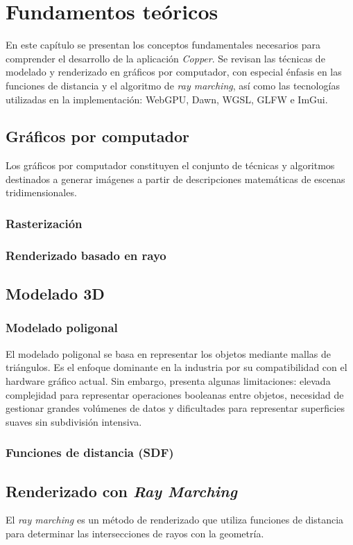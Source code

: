 \chapter{Fundamentos teóricos}

En este capítulo se presentan los conceptos fundamentales necesarios para comprender el desarrollo de la aplicación \textit{Copper}. Se revisan las técnicas de modelado y renderizado en gráficos por computador, con especial énfasis en las funciones de distancia y el algoritmo de \textit{ray marching}, así como las tecnologías utilizadas en la implementación: WebGPU, Dawn, WGSL, GLFW e ImGui.

\section{Gráficos por computador}
Los gráficos por computador constituyen el conjunto de técnicas y algoritmos destinados a generar imágenes a partir de descripciones matemáticas de escenas tridimensionales.


\subsection{Rasterización}
\subsection{Renderizado basado en rayo}

\section{Modelado 3D}
\subsection{Modelado poligonal}
El modelado poligonal se basa en representar los objetos mediante mallas de triángulos. Es el enfoque dominante en la industria por su compatibilidad con el hardware gráfico actual. Sin embargo, presenta algunas limitaciones: elevada complejidad para representar operaciones booleanas entre objetos, necesidad de gestionar grandes volúmenes de datos y dificultades para representar superficies suaves sin subdivisión intensiva.

\subsection{Funciones de distancia (SDF)}

\section{Renderizado con \textit{Ray Marching}}
El \textit{ray marching} es un método de renderizado que utiliza funciones de distancia para determinar las intersecciones de rayos con la geometría.

